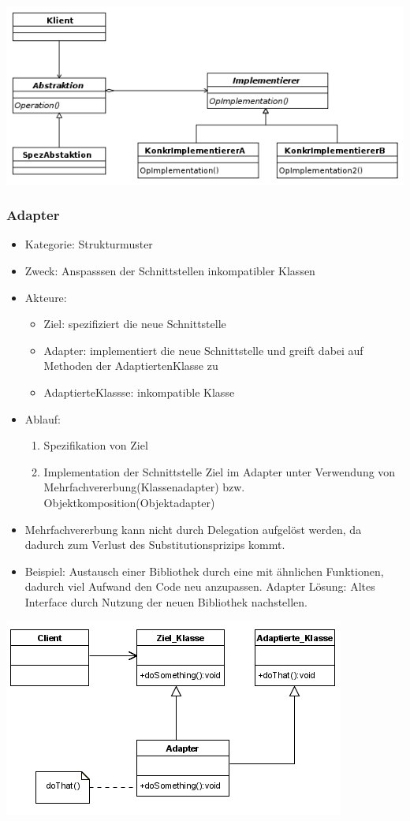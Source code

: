 \documentclass[11pt, fleqn, a4paper, leqno]{scrartcl} %
\begin{document}
			\includegraphics[scale=0.4]{images/bridge.png}
			\newpage
		\subsubsection{Adapter}
			\begin{itemize}
				\item Kategorie: Strukturmuster
				\item Zweck: Anspasssen der Schnittstellen inkompatibler Klassen
				\item Akteure: 
				\begin{itemize}
					\item Ziel: spezifiziert die neue Schnittstelle
					\item Adapter: implementiert die neue Schnittstelle und greift dabei auf Methoden der AdaptiertenKlasse zu
					\item AdaptierteKlassse: inkompatible Klasse
				\end{itemize}
				\item Ablauf:
				\begin{enumerate}
					\item Spezifikation von Ziel
					\item Implementation der Schnittstelle Ziel im Adapter unter Verwendung von Mehrfachvererbung(Klassenadapter) bzw. Objektkomposition(Objektadapter)
				\end{enumerate}
				\item Mehrfachvererbung kann nicht durch Delegation aufgelöst werden, da dadurch zum Verlust des Substitutionsprizips kommt.
				\item Beispiel: Austausch einer Bibliothek durch eine mit ähnlichen Funktionen, dadurch viel Aufwand den Code neu anzupassen. Adapter Lösung: Altes Interface durch Nutzung der neuen Bibliothek nachstellen.
			\end{itemize}
			\includegraphics[scale=0.7]{images/adapter.png}
			\newpage
\end{document}
